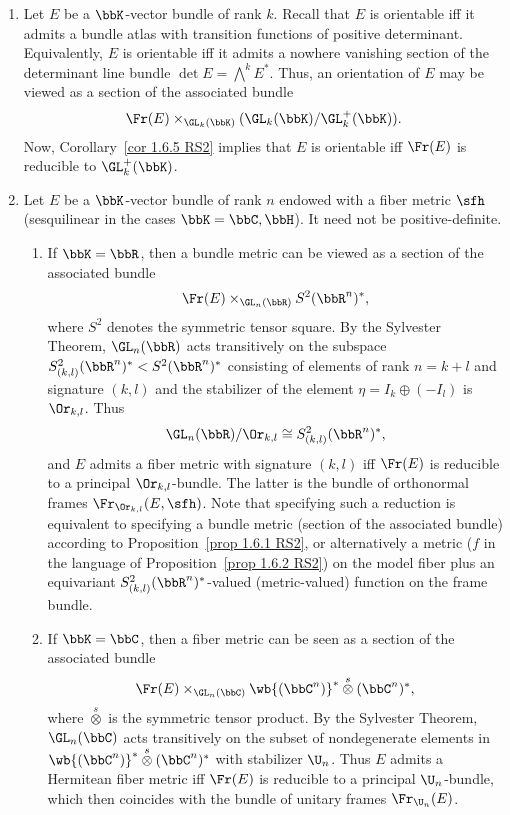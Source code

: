 \begin{example}[{{\cite[Ex.~1.6.6]{RS2}}}]
    \begin{enumerate}
        \item Let $E$ be a $\bbK$-vector bundle of rank $k$. Recall that $E$ is orientable iff it admits a bundle atlas with transition functions of positive determinant. Equivalently, $E$ is orientable iff it admits a nowhere vanishing section of the determinant line bundle $\det E=\bigwedge^k E^\ast$. Thus, an orientation of $E$ may be viewed as a section of the associated bundle
        \[\Fr(E)\times_{\GL_k(\bbK)}(\GL_k(\bbK)\slash \GL^+_k(\bbK)).\]
        Now, Corollary~\ref{cor 1.6.5 RS2} implies that $E$ is orientable iff $\Fr(E)$ is reducible to $\GL_k^+(\bbK)$.

        \item Let $E$ be a $\bbK$-vector bundle of rank $n$ endowed with a fiber metric $\sfh$ (sesquilinear in the cases $\bbK=\bbC,\bbH$). It need not be positive-definite.
        \begin{enumerate}
            \item If $\bbK=\bbR$, then a bundle metric can be viewed as a section of the associated bundle
            \[\Fr(E)\times_{\GL_n(\bbR)} S^2(\bbR^n)^\ast,\]
            where $S^2$ denotes the symmetric tensor square. By the Sylvester Theorem, $\GL_n(\bbR)$ acts transitively on the subspace $S^2_{(k,l)}(\bbR^n)^\ast< S^2(\bbR^n)^\ast$ consisting of elements of rank $n=k+l$ and signature $(k,l)$ and the stabilizer of the element $\eta=I_k\oplus (-I_l)$ is $\Or_{k,l}$. Thus
            \[\GL_n(\bbR)\slash \Or_{k,l}\cong S^2_{(k,l)}(\bbR^n)^\ast,\]
            and $E$ admits a fiber metric with signature $(k,l)$ iff $\Fr(E)$ is reducible to a principal $\Or_{k,l}$-bundle. The latter is the bundle of orthonormal frames $\Fr_{\Or_{k,l}}(E,\sfh)$. Note that specifying such a reduction is equivalent to specifying a bundle metric (section of the associated bundle) according to Proposition~\ref{prop 1.6.1 RS2}, or alternatively a metric ($f$ in the language of Proposition~\ref{prop 1.6.2 RS2}) on the model fiber plus an equivariant $S^2_{(k,l)}(\bbR^n)^\ast$-valued (metric-valued) function on the frame bundle.

            \item If $\bbK=\bbC$, then a fiber metric can be seen as a section of the associated bundle
            \[\Fr(E)\times_{\GL_n(\bbC)} \wb{(\bbC^n)}^\ast\overset{s}{\otimes} (\bbC^n)^\ast,\]
            where $\overset{s}{\otimes}$ is the symmetric tensor product. By the Sylvester Theorem, $\GL_n(\bbC)$ acts transitively on the subset of nondegenerate elements in $\wb{(\bbC^n)}^\ast\overset{s}{\otimes} (\bbC^n)^\ast$ with stabilizer $\U_n$. Thus $E$ admits a Hermitean fiber metric iff $\Fr(E)$ is reducible to a principal $\U_n$-bundle, which then coincides with the bundle of unitary frames $\Fr_{\U_n}(E)$.
        \end{enumerate}
    \end{enumerate}
\end{example}

